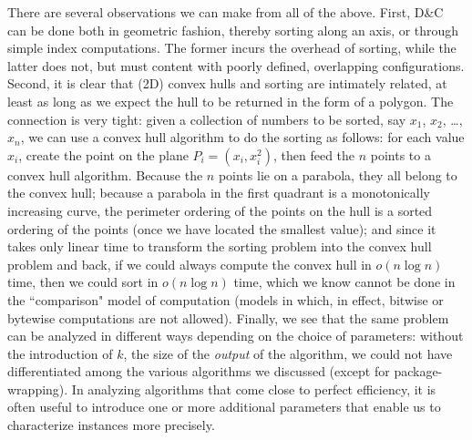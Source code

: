 \documentclass[11pt]{article}
\begin{document}
There are several observations we can make from all of the above.
First, D\&{}C can be done both in geometric fashion, thereby sorting
along an axis, or through simple index computations.  The former incurs
the overhead of sorting, while the latter does not, but must content
with poorly defined, overlapping configurations.   Second, it is clear
that (2D) convex hulls and sorting are intimately related, at least as
long as we expect the hull to be returned in the form of a polygon.
The connection is very tight: given a collection of numbers to be
sorted, say $x_1$, $x_2$, \dots, $x_n$, we can use a convex hull algorithm
to do the sorting as follows: for each value $x_i$, create the point
on the plane $P_i=(x_i,x_i^2)$, then feed the $n$ points to a convex hull
algorithm.  Because the $n$ points lie on a parabola, they all belong
to the convex hull; because a parabola in the first quadrant is a monotonically
increasing curve, the perimeter ordering of the points on the hull is a
sorted ordering of the points (once we have located the smallest value);
and since it takes only linear time to transform the sorting problem into
the convex hull problem and back, if we could always compute the convex
hull in $o(n\log n)$ time, then we could sort in $o(n\log n)$ time, which
we know cannot be done in the ``comparison" model of computation (models
in which, in effect, bitwise or bytewise computations are not allowed).
Finally, we see that the same problem can be analyzed in different ways
depending on the choice of parameters: without the introduction of $k$,
the size of the \emph{output} of the algorithm, we could not
have differentiated among the various algorithms we discussed (except
for package-wrapping).  In analyzing algorithms that come close to
perfect efficiency, it is often useful to introduce one or more additional
parameters that enable us to characterize instances more precisely.
\end{document}
